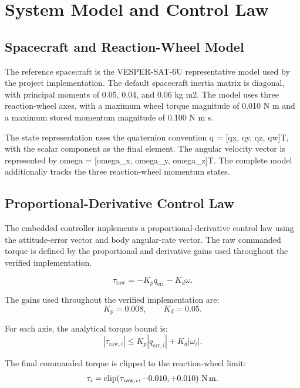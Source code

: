 \documentclass[11pt,a4paper]{article}
\begin{document}
\section{System Model and Control Law}

\subsection{Spacecraft and Reaction-Wheel Model}

The reference spacecraft is the VESPER-SAT-6U representative model used by the project implementation. The default spacecraft inertia matrix is diagonal, with principal moments of 0.05, 0.04, and 0.06 kg m2. The model uses three reaction-wheel axes, with a maximum wheel torque magnitude of 0.010 N m and a maximum stored momentum magnitude of 0.100 N m s.

The state representation uses the quaternion convention q = [qx, qy, qz, qw]T, with the scalar component as the final element. The angular velocity vector is represented by omega = [omega_x, omega_y, omega_z]T. The complete model additionally tracks the three reaction-wheel momentum states.\subsection{Proportional-Derivative Control Law}

The embedded controller implements a proportional-derivative control law using the attitude-error vector and body angular-rate vector. The raw commanded torque is defined by the proportional and derivative gains used throughout the verified implementation.

\begin{equation}
\tau_{\mathrm{raw}}=-K_p q_{\mathrm{err}}-K_d\omega.
\end{equation}

The gains used throughout the verified implementation are: 
\begin{equation}
K_p=0.008,\qquad K_d=0.05.
\end{equation}


For each axis, the analytical torque bound is:
\begin{equation}
|\tau_{\mathrm{raw},i}|\leq K_p|q_{\mathrm{err},i}|+K_d|\omega_i|.
\end{equation}

The final commanded torque is clipped to the reaction-wheel limit:
\begin{equation}
\tau_i=\operatorname{clip}(\tau_{\mathrm{raw},i},-0.010,+0.010)\ {\rm N\,m}.
\end{equation}
\end{document}
